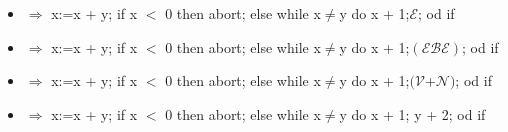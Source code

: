 \begin{itemize}
\item $\Rightarrow$ x:=x + y; if x $<$ 0 then abort; else while x$ \neq $y do x + 1;$\mathcal{E}$; od if
\item $\Rightarrow$ x:=x + y; if x $<$ 0 then abort; else while x$ \neq $y do x + 1;$(\mathcal{E} \mathcal{B} \mathcal{E})$; od if
\item $\Rightarrow$ x:=x + y; if x $<$ 0 then abort; else while x$ \neq $y do x + 1;$(\mathcal{V} $+$ \mathcal{N})$; od if
\item $\Rightarrow$ x:=x + y; if x $<$ 0 then abort; else while x$ \neq $y do x + 1; y + 2; od if

\end{itemize}